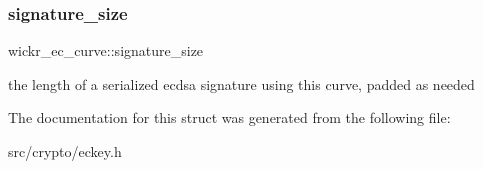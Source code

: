 \subsubsection{\texorpdfstring{signature\+\_\+size}{signature\_size}}
{\footnotesize\ttfamily wickr\+\_\+ec\+\_\+curve\+::signature\+\_\+size}

the length of a serialized ecdsa signature using this curve, padded as needed 

The documentation for this struct was generated from the following file\+:\begin{DoxyCompactItemize}
\item 
src/crypto/eckey.\+h\end{DoxyCompactItemize}
